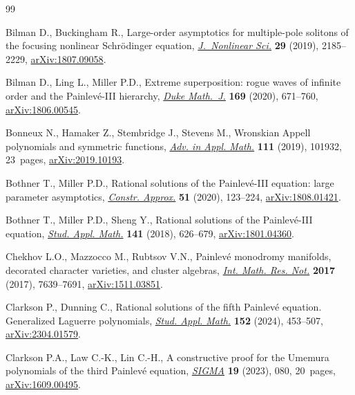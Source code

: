 \documentclass[pdftex]{sigma}
\numberwithin{equation}{section}
\begin{document}
\begin{thebibliography}{99}
\footnotesize\itemsep=0pt

Bilman D., Buckingham R., Large-order asymptotics for multiple-pole solitons of
 the focusing nonlinear {S}chr\"odinger equation, \href{https://doi.org/10.1007/s00332-019-09542-7}{\textit{J.~Nonlinear Sci.}}
 \textbf{29} (2019), 2185--2229, \href{https://arxiv.org/abs/1807.09058}{arXiv:1807.09058}.

Bilman D., Ling L., Miller P.D., Extreme superposition: rogue waves of infinite
 order and the {P}ainlev\'e-{III} hierarchy, \href{https://doi.org/10.1215/00127094-2019-0066}{\textit{Duke Math.~J.}}
 \textbf{169} (2020), 671--760, \href{https://arxiv.org/abs/1806.00545}{arXiv:1806.00545}.

Bonneux N., Hamaker Z., Stembridge J., Stevens M., Wronskian {A}ppell
 polynomials and symmetric functions, \href{https://doi.org/10.1016/j.aam.2019.101932}{\textit{Adv. in Appl. Math.}}
 \textbf{111} (2019), 101932, 23~pages, \href{https://arxiv.org/abs/2019.10193}{arXiv:2019.10193}.

Bothner T., Miller P.D., Rational solutions of the {P}ainlev\'e-{III} equation:
 large parameter asymptotics, \href{https://doi.org/10.1007/s00365-019-09463-4}{\textit{Constr. Approx.}} \textbf{51} (2020),
 123--224, \href{https://arxiv.org/abs/1808.01421}{arXiv:1808.01421}.

Bothner T., Miller P.D., Sheng Y., Rational solutions of the {P}ainlev\'e-{III}
 equation, \href{https://doi.org/10.1111/sapm.12220}{\textit{Stud. Appl. Math.}} \textbf{141} (2018), 626--679,
 \href{https://arxiv.org/abs/1801.04360}{arXiv:1801.04360}.

Chekhov L.O., Mazzocco M., Rubtsov V.N., Painlev\'e monodromy manifolds,
 decorated character varieties, and cluster algebras, \href{https://doi.org/10.1093/imrn/rnw219}{\textit{Int. Math. Res.
 Not.}} \textbf{2017} (2017), 7639--7691, \href{https://arxiv.org/abs/1511.03851}{arXiv:1511.03851}.

Clarkson P., Dunning C., Rational solutions of the fifth Painlev\'e equation.
 Generalized Laguerre polynomials, \href{https://doi.org/10.1111/sapm.12649}{\textit{Stud. Appl. Math.}} \textbf{152}
 (2024), 453--507, \href{https://arxiv.org/abs/2304.01579}{arXiv:2304.01579}.

Clarkson P.A., Law C.-K., Lin C.-H., A constructive proof for the {U}memura
 polynomials of the third {P}ainlev\'e equation, \href{https://doi.org/10.3842/SIGMA.2023.080}{\textit{SIGMA}} \textbf{19}
 (2023), 080, 20~pages, \href{https://arxiv.org/abs/1609.00495}{arXiv:1609.00495}.


\end{thebibliography}
\end{document}
